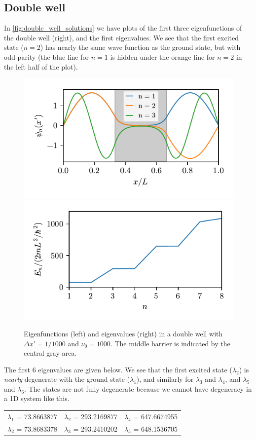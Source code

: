 \subsection*{Double well}
In \cref{fig:double_well_solutions} we have plots of the first three eigenfunctions of the double well (right), and the first eigenvalues. We see that the first excited state ($n=2$) has nearly the same wave function as the ground state, but with odd parity (the blue line for $n=1$ is hidden under the orange line for $n=2$ in the left half of the plot).
\begin{figure}[ht!]%
\centering%
\includegraphics{figs/double_eigenfunctions.pdf}%
\includegraphics{figs/double_eigenvalues.pdf}%
\caption{Eigenfunctions (left) and eigenvalues (right) in a double well with $\Delta x' = 1/1000$ and $\nu_0 = 1000$. The middle barrier is indicated by the central gray area. \label{fig:well_solutions}}%
\end{figure}

The first 6 eigenvalues are given below. We see that the first excited state ($\lambda_2$) is \emph{nearly} degenerate with the ground state ($\lambda_1$), and similarly for $\lambda_3$ and $\lambda_4$, and $\lambda_5$ and $\lambda_6$. The states are not fully degenerate because we cannot have degeneracy in a 1D system like this.
\begin{center}
\begin{tabular}{ccc}
$\lambda_1$ = 73.8663877 & $\lambda_2$ = 293.2169877 & $\lambda_4$ = 647.6674955 \\
$\lambda_2$ = 73.8683378 & $\lambda_3$ = 293.2410202 & $\lambda_5$ = 648.1536705
\end{tabular}
\end{center}

